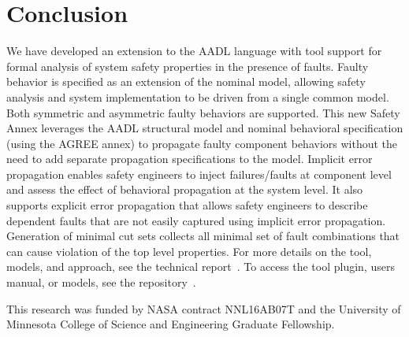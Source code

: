 \section{Conclusion}


We have developed an extension to the AADL language with tool support for formal analysis of system safety properties in the presence of faults. Faulty behavior is specified as an extension of the nominal model, allowing safety analysis and system implementation to be driven from a single common model. Both symmetric and asymmetric faulty behaviors are supported. This new Safety Annex leverages the AADL structural model and nominal behavioral specification (using the AGREE annex) to propagate faulty component behaviors without the need to add separate propagation specifications to the model. Implicit %
error propagation enables safety engineers to inject failures/faults at component level and assess the effect of behavioral propagation at the system level. It also supports explicit 
error propagation that allows safety engineers to describe dependent faults that are not easily captured using implicit %
error propagation. Generation of minimal cut sets collects all minimal set of fault combinations that can cause violation of the top level properties. 
For more details on the tool, models, and approach, see the technical report~\cite{SATechReport}. 
To access the tool plugin, users manual, or models, see the repository~\cite{SAGithub}. 


\vspace{2 mm}
 This research was funded by NASA contract NNL16AB07T and the University of Minnesota College of Science and Engineering Graduate Fellowship.

